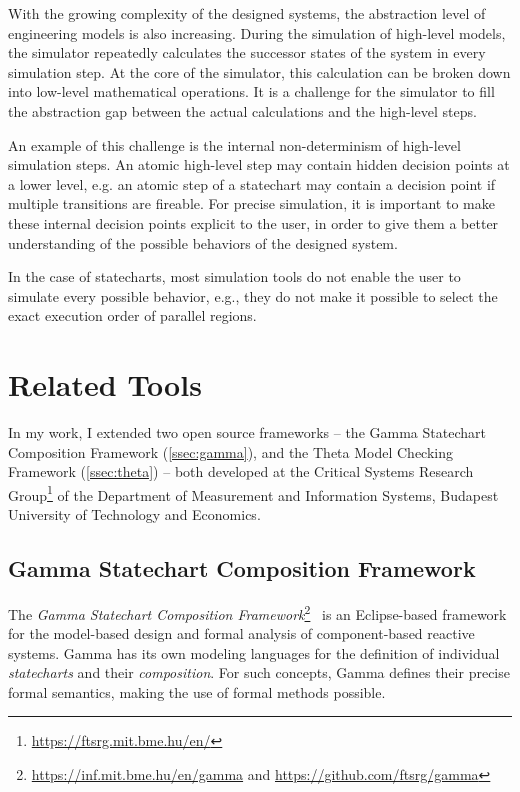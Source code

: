 With the growing complexity of the designed systems, the abstraction level of engineering models is also increasing. During the simulation of high-level models, the simulator repeatedly calculates the successor states of the system in every simulation step. At the core of the simulator, this calculation can be broken down into low-level mathematical operations. It is a challenge for the simulator to fill the abstraction gap between the actual calculations and the high-level steps.

An example of this challenge is the internal non-determinism of high-level simulation steps. An atomic high-level step may contain hidden decision points at a lower level, e.g. an atomic step of a statechart may contain a decision point if multiple transitions are fireable. For precise simulation, it is important to make these internal decision points explicit to the user, in order to give them a better understanding of the possible behaviors of the designed system.

In the case of statecharts, most simulation tools do not enable the user to simulate every possible behavior, e.g., they do not make it possible to select the exact execution order of parallel regions.

\section{Related Tools}\label{sec:tools}

In my work, I extended two open source frameworks -- the Gamma Statechart Composition Framework (\autoref{ssec:gamma}), and the Theta Model Checking Framework (\autoref{ssec:theta}) -- both developed at the Critical Systems Research Group\footnote{\url{https://ftsrg.mit.bme.hu/en/}} of the Department of Measurement and Information Systems, Budapest University of Technology and Economics.

\subsection{Gamma Statechart Composition Framework}\label{ssec:gamma}

The \textit{Gamma Statechart Composition Framework}\footnote{\url{https://inf.mit.bme.hu/en/gamma} and \url{https://github.com/ftsrg/gamma}}~\cite{Gamma} is an Eclipse-based framework for the model-based design and formal analysis of component-based reactive systems. Gamma has its own modeling languages for the definition of individual \textit{statecharts} and their \textit{composition}. For such concepts, Gamma defines their precise formal semantics, making the use of formal methods possible.

